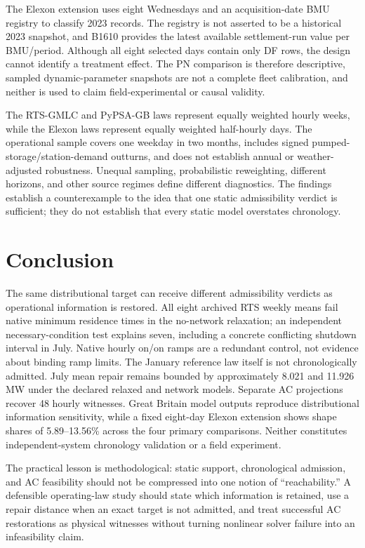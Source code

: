 \documentclass[journal]{IEEEtran}
\begin{document}
The Elexon extension uses eight Wednesdays and an acquisition-date BMU registry to classify 2023 records. The registry is not asserted to be a historical 2023 snapshot, and B1610 provides the latest available settlement-run value per BMU/period. Although all eight selected days contain only DF rows, the design cannot identify a treatment effect. The PN comparison is therefore descriptive, sampled dynamic-parameter snapshots are not a complete fleet calibration, and neither is used to claim field-experimental or causal validity.

The RTS-GMLC and PyPSA-GB laws represent equally weighted hourly weeks, while the Elexon laws represent equally weighted half-hourly days. The operational sample covers one weekday in two months, includes signed pumped-storage/station-demand outturns, and does not establish annual or weather-adjusted robustness. Unequal sampling, probabilistic reweighting, different horizons, and other source regimes define different diagnostics. The findings establish a counterexample to the idea that one static admissibility verdict is sufficient; they do not establish that every static model overstates chronology.

\section{Conclusion}
The same distributional target can receive different admissibility verdicts as operational information is restored. All eight archived RTS weekly means fail native minimum residence times in the no-network relaxation; an independent necessary-condition test explains seven, including a concrete conflicting shutdown interval in July. Native hourly on/on ramps are a redundant control, not evidence about binding ramp limits. The January reference law itself is not chronologically admitted. July mean repair remains bounded by approximately 8.021 and 11.926 MW under the declared relaxed and network models. Separate AC projections recover 48 hourly witnesses. Great Britain model outputs reproduce distributional information sensitivity, while a fixed eight-day Elexon extension shows shape shares of 5.89--13.56\% across the four primary comparisons. Neither constitutes independent-system chronology validation or a field experiment.

The practical lesson is methodological: static support, chronological admission, and AC feasibility should not be compressed into one notion of ``reachability.'' A defensible operating-law study should state which information is retained, use a repair distance when an exact target is not admitted, and treat successful AC restorations as physical witnesses without turning nonlinear solver failure into an infeasibility claim.
\end{document}
